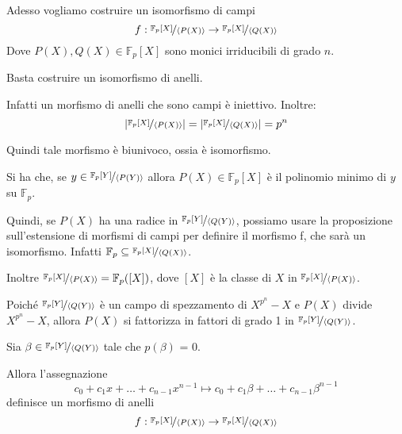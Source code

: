 \documentclass[../main.tex]{subfiles}
\begin{document}
Adesso vogliamo costruire un isomorfismo di campi
\begin{equation*}
    f: \nicefrac{\mathbb{F}_p[X]}{\langle P(X)\rangle} \rightarrow \nicefrac{\mathbb{F}_p[X]}{\langle Q(X)\rangle}
\end{equation*}
Dove $P(X), Q(X) \in \mathbb{F}_p[X]$ sono monici irriducibili di grado $n$.

Basta costruire un isomorfismo di anelli.

Infatti un morfismo di anelli che sono campi è iniettivo. Inoltre:
\begin{equation*}
    |\nicefrac{\mathbb{F}_p[X]}{\langle P(X)\rangle}| = |\nicefrac{\mathbb{F}_p[X]}{\langle Q(X)\rangle}| = p^n
\end{equation*}

Quindi tale morfismo è biunivoco, ossia è isomorfismo.

Si ha che, se $y \in \nicefrac{\mathbb{F}_p[Y]}{\langle P(Y)\rangle}$ allora $P(X) \in \mathbb{F}_p[X]$ è il polinomio minimo di $y$ su $\mathbb{F}_p$.

Quindi, se $P(X)$ ha una radice in $\nicefrac{\mathbb{F}_p[Y]}{\langle Q(Y)\rangle}$, possiamo usare la proposizione sull'estensione di morfismi di campi per definire il morfismo f, che sarà un isomorfismo. Infatti $\mathbb{F}_p \subseteq \nicefrac{\mathbb{F}_p[X]}{\langle Q(X)\rangle}$.

Inoltre $\nicefrac{\mathbb{F}_p[X]}{\langle P(X)\rangle} = \mathbb{F}_p([X])$, dove $[X]$ è la classe di $X$ in $\nicefrac{\mathbb{F}_p[X]}{\langle P(X)\rangle}$.

Poiché $\nicefrac{\mathbb{F}_p[Y]}{\langle Q(Y)\rangle}$ è un campo di spezzamento di $X^{p^n} - X$ e $P(X)$ divide $X^{p^n} - X$, allora $P(X)$ si fattorizza in fattori di grado 1 in $\nicefrac{\mathbb{F}_p[Y]}{\langle Q(Y)\rangle}$.

Sia $\beta \in \nicefrac{\mathbb{F}_p[Y]}{\langle Q(Y)\rangle}$ tale che $p(\beta)$ = 0.

Allora l'assegnazione
\begin{equation*}
    c_0 + c_1 x + \ldots + c_{n-1} x^{n-1} \mapsto c_0 + c_1 \beta + \ldots + c_{n-1} \beta^{n-1}
\end{equation*}
definisce un morfismo di anelli
\begin{equation*}
    f: \nicefrac{\mathbb{F}_p[X]}{\langle P(X)\rangle} \rightarrow \nicefrac{\mathbb{F}_p[X]}{\langle Q(X)\rangle}
\end{equation*}
\end{document}
